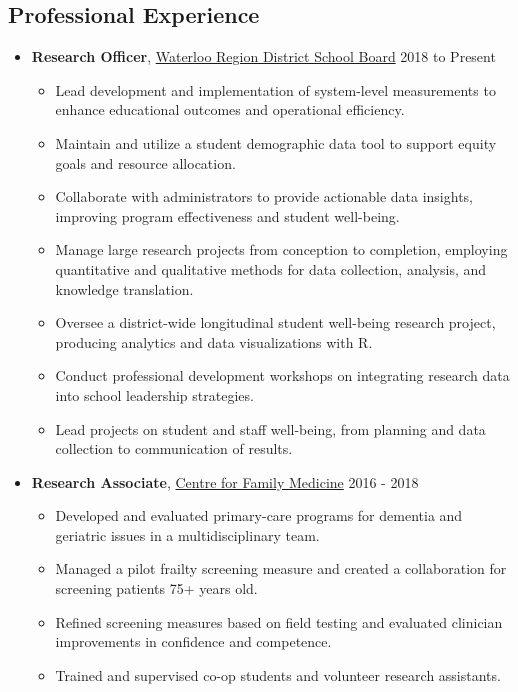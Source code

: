 \documentclass[10pt]{article}
\providecommand{\tightlist}{%
  \setlength{\itemsep}{0pt}\setlength{\parskip}{0pt}}
\begin{document}
\subsection{Professional Experience}\label{professional-experience}

\begin{itemize}
\item
  \textbf{Research Officer},
  \href{https://www.wrdsb.ca/about-the-wrdsb/research/}{Waterloo Region
  District School Board} \hfill  2018 to Present

  \begin{itemize}
  \tightlist
  \item
    Lead development and implementation of system-level measurements to
    enhance educational outcomes and operational efficiency.
  \item
    Maintain and utilize a student demographic data tool to support
    equity goals and resource allocation.
  \item
    Collaborate with administrators to provide actionable data insights,
    improving program effectiveness and student well-being.
  \item
    Manage large research projects from conception to completion,
    employing quantitative and qualitative methods for data collection,
    analysis, and knowledge translation.
  \item
    Oversee a district-wide longitudinal student well-being research
    project, producing analytics and data visualizations with R.
  \item
    Conduct professional development workshops on integrating research
    data into school leadership strategies.
  \item
    Lead projects on student and staff well-being, from planning and
    data collection to communication of results.
  \end{itemize}
\end{itemize}

\pagebreak[2]

\begin{itemize}
\item
  \textbf{Research Associate}, \href{https://family-medicine.ca/}{Centre
  for Family Medicine} \hfill 2016 - 2018

  \begin{itemize}
  \tightlist
  \item
    Developed and evaluated primary-care programs for dementia and
    geriatric issues in a multidisciplinary team.
  \item
    Managed a pilot frailty screening measure and created a
    collaboration for screening patients 75+ years old.
  \item
    Refined screening measures based on field testing and evaluated
    clinician improvements in confidence and competence.
  \item
    Trained and supervised co-op students and volunteer research
    assistants.
  \end{itemize}
\end{itemize}
\end{document}
